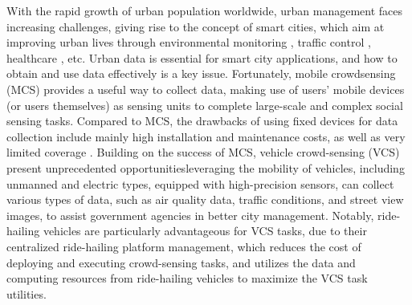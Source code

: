 With the rapid growth of urban population worldwide, urban management faces increasing challenges, giving rise to the concept of smart cities, which aim at improving urban lives through environmental monitoring \cite{EnvironmentalPollution}, traffic control \cite{PervasiveandMobileComputing}, healthcare \cite{ExpertSystems}, etc. Urban data is essential for smart city applications, and how to obtain and use data effectively is a key issue. Fortunately, mobile crowdsensing (MCS) \cite{ITJ19} provides a useful way to collect data, making use of users' mobile devices (or users themselves) as sensing units to complete large-scale and complex social sensing tasks. Compared to MCS, the drawbacks of using fixed devices for data collection include mainly high installation and maintenance costs, as well as very limited coverage \cite{BigData}. 
%
Building on the success of MCS, vehicle crowd-sensing (VCS) present unprecedented opportunitiesleveraging the mobility of vehicles, including unmanned and electric types, equipped with high-precision sensors, can collect various types of data, such as air quality data, traffic conditions, and street view images, to assist government agencies in better city management. 
Notably, ride-hailing vehicles are particularly advantageous for VCS tasks, due to their centralized ride-hailing platform management, which reduces the cost of deploying and executing crowd-sensing tasks, and utilizes the data and computing resources from ride-hailing vehicles to maximize the VCS task utilities.



